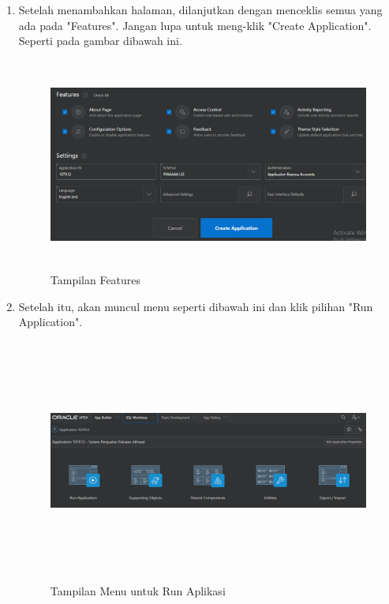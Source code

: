 \documentclass[a4paper, 12pt]{article}
\begin{document}
\begin{enumerate}
\item Setelah menambahkan halaman, dilanjutkan dengan menceklis semua yang ada pada "Features". Jangan lupa untuk meng-klik "Create Application". Seperti pada gambar dibawah ini.

            \begin{figure}[!htbp]
            \centering
            \includegraphics[width=12cm,height=7cm]{gambar/8-createapp.PNG}
            \caption{Tampilan Features}
            \label{penanda}
            \end{figure}
            
\item Setelah itu, akan muncul menu seperti dibawah ini dan klik pilihan "Run Application".

            \begin{figure}[!htbp]
            \centering
            \includegraphics[width=12cm,height=8cm]{gambar/9-createapp.PNG}
            \caption{Tampilan Menu untuk Run Aplikasi}
            \label{penanda}
            \end{figure}
            

\end{enumerate}
\end{document}
